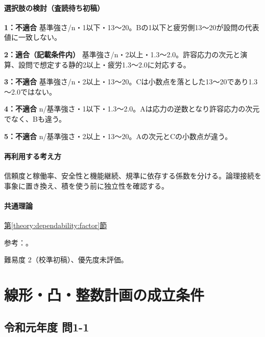 \paragraph{選択肢の検討（査読待ち初稿）}\mbox{}\par

\noindent\textbf{1：不適合} 基準強さ/n・1以下・13～20。Bの1以下と疲労側13～20が設問の代表値に一致しない。\par

\noindent\textbf{2：適合（記載条件内）} 基準強さ/n・2以上・1.3～2.0。許容応力の次元と演算、設問で想定する静的2以上・疲労1.3～2.0に対応する。\par

\noindent\textbf{3：不適合} 基準強さ/n・2以上・13～20。Cは小数点を落とした13～20であり1.3～2.0ではない。\par

\noindent\textbf{4：不適合} n/基準強さ・1以下・1.3～2.0。Aは応力の逆数となり許容応力の次元でなく、Bも違う。\par

\noindent\textbf{5：不適合} n/基準強さ・2以上・13～20。Aの次元とCの小数点が違う。\par

\paragraph{再利用する考え方} 信頼度と稼働率、安全性と機能継続、規準に依存する係数を分ける。論理接続を事象に置き換え、積を使う前に独立性を確認する。

\paragraph{共通理論} \hyperref[theory:dependability:factor]{第\ref*{theory:dependability:factor}節}

\par 参考：\cite{struct_mit_beam,struct_nims_data,design_faa_2011}。

\par 難易度 2（校準初稿）、優先度未評価。

\section{線形・凸・整数計画の成立条件}

\subsection{令和元年度 問1-1}
\label{q:r01-reg-basic-1-1}

